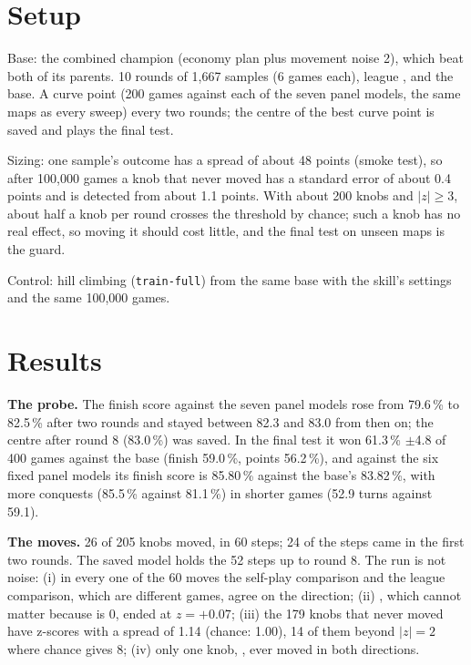 \documentclass{../polyexp}
\begin{document}
\section{Setup}
Base: the combined champion (economy plan plus movement noise 2), which beat both of its parents. 10 rounds of 1,667 samples (6 games each), league ,  and the base. A curve point (200 games against each of the seven panel models, the same maps as every sweep) every two rounds; the centre of the best curve point is saved and plays the final test.

Sizing: one sample's outcome has a spread of about 48 points (smoke test), so after 100,000 games a knob that never moved has a standard error of about 0.4 points and is detected from about 1.1 points. With about 200 knobs and $|z|\ge 3$, about half a knob per round crosses the threshold by chance; such a knob has no real effect, so moving it should cost little, and the final test on unseen maps is the guard.

Control: hill climbing (\texttt{train-full}) from the same base with the skill's settings and the same 100,000 games.

\section{Results}
\ExpResults

\textbf{The probe.} The finish score against the seven panel models rose from 79.6\,\% to 82.5\,\% after two rounds and stayed between 82.3 and 83.0 from then on; the centre after round 8 (83.0\,\%) was saved. In the final test it won 61.3\,\% $\pm$4.8 of 400 games against the base (finish 59.0\,\%, points 56.2\,\%), and against the six fixed panel models its finish score is 85.80\,\% against the base's 83.82\,\%, with more conquests (85.5\,\% against 81.1\,\%) in shorter games (52.9 turns against 59.1).

\textbf{The moves.} 26 of 205 knobs moved, in 60 steps; 24 of the steps came in the first two rounds. The saved model holds the 52 steps up to round 8. The run is not noise: (i) in every one of the 60 moves the self-play comparison and the league comparison, which are different games, agree on the direction; (ii) , which cannot matter because  is 0, ended at $z=+0.07$; (iii) the 179 knobs that never moved have z-scores with a spread of 1.14 (chance: 1.00), 14 of them beyond $|z|=2$ where chance gives 8; (iv) only one knob, , ever moved in both directions.
\end{document}
